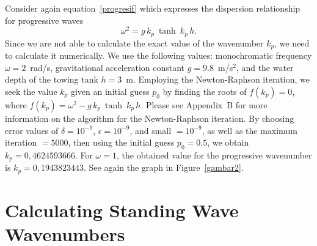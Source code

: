 \documentclass[12pt,a4paper]{report}
\begin{document}
Consider again equation~\eqref{progresif} which expresses the dispersion relationship for progressive waves
\begin{equation}
\omega^2 = g\,k_{p}\: \tanh\: k_{p}\,h.
\end{equation}
Since we are not able to calculate the exact value of the wavenumber $k_p$, we need to calculate it numerically. We use the following values: monochromatic frequency $\omega = 2$~rad/s, gravitational acceleration constant $g = 9.8$~m/s$^2$, and the water depth of the towing tank $h = 3$~m. Employing the Newton-Raphson iteration, we seek the value $k_p$ given an initial guess $p_0$ by finding the roots of $f(k_{p}) = 0$, where $f(k_{p}) = \omega^2 - g\, k_{p} \: \tanh \: k_{p} \, h$. Please see Appendix~B for more information on the algorithm for the Newton-Raphson iteration. By choosing error values of $\delta = 10^{-9}$, $\epsilon = 10^{-9}$, and {\ttfamily small} $= 10^{-9}$, as well as the maximum iteration $= 5000$, then using the initial guess $p_{0} = 0.5$, we obtain $k_{p} = 0,4624593666$. For $\omega = 1$, the obtained value for the progressive wavenumber is $k_{p} = 0,1943823443$. See again the graph in Figure~\ref{gambar2}.

\section{Calculating Standing Wave Wavenumbers} \label{NR2}
\end{document}
